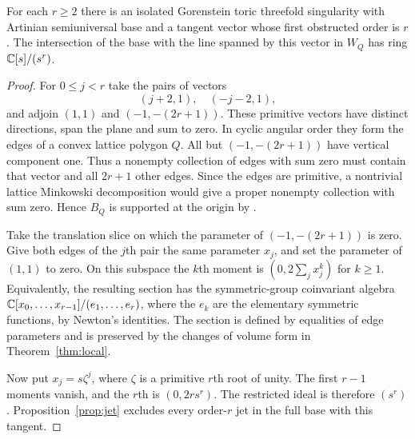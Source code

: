 \begin{proposition}\label{prop:orders}
For each $r\geq2$ there is an isolated Gorenstein toric threefold
singularity with Artinian semiuniversal base and a tangent vector
whose first obstructed order is $r$. The intersection of the base with
the line spanned by this vector in $W_Q$ has ring $\mathbb C[s]/(s^r)$.
\end{proposition}

\begin{proof}
For $0\leq j<r$ take the pairs of vectors
\[
        (j+2,1),\quad (-j-2,1),
\]
and adjoin $(1,1)$ and $(-1,-(2r+1))$. These primitive vectors
have distinct directions, span the plane and sum to zero. In cyclic
angular order they form the edges of a convex lattice polygon $Q$.
All but $(-1,-(2r+1))$ have vertical component one. Thus
a nonempty collection of edges with sum zero must contain that vector
and all $2r+1$ other edges. Since the edges are primitive, a
nontrivial lattice Minkowski decomposition would give a proper
nonempty collection with sum zero. Hence $B_Q$ is supported at the
origin by \cite[\S2.5]{Alt}.

Take the translation slice on which the parameter of $(-1,-(2r+1))$
is zero. Give both edges of the $j$th pair the same parameter $x_j$, and
set the parameter of $(1,1)$ to zero. On this subspace the $k$th
moment is $(0,2\sum_j x_j^k)$ for $k\geq1$. Equivalently, the
resulting section has the symmetric-group coinvariant algebra
$\mathbb C[x_0,\ldots,x_{r-1}]/(e_1,\ldots,e_r)$, where the $e_k$ are the
elementary symmetric functions, by Newton's identities. The section
is defined by equalities of edge parameters and is preserved by the
changes of volume form in Theorem~\ref{thm:local}.

Now put $x_j=s\zeta^j$, where $\zeta$ is a primitive $r$th root of
unity. The first $r-1$ moments vanish, and the $r$th is $(0,2r s^r)$.
The restricted ideal is therefore $(s^r)$. Proposition~\ref{prop:jet}
excludes every order-$r$ jet in the full base with this tangent.
\end{proof}
